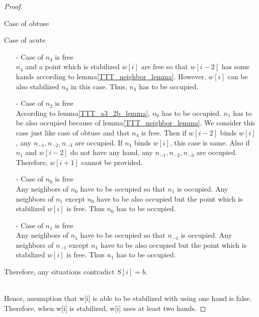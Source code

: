 \documentclass[runningheads]{llncs}
\begin{document}
\begin{proof}
\begin{paragraph}{Case of obtuse}
\end{paragraph}



\begin{paragraph}{Case of acute}
\begin{itemize}
\item[-] Case of $n_4$ is free\\
$n_4$ and a point which is stabilized $w[i]$ are free so that  $w[i-2]$ has some hands according to lemma\ref{TTT_neighbor_lemma}.
However, $w[i]$ can be also stabilized $n_4$ in this case. Thus, $n_4$ has to be occupied.
\item[-] Case of $n_2$ is free\\
According to lemma\ref{TTT_a3_2b_lemma}, $n_0$ has to be occupied. $n_1$ has to be also occupied because of lemma\ref{TTT_neighbor_lemma}.
We consider this case just like case of obtuse and that $n_4$ is free. Then if $w[i-2]$ binds $w[i]$, any $n_{-1}, n_{-2}, n_{-3}$ are occupied. If $n_1$ binds $w[i]$, this case is same. Also if $n_1$ and $w[i-2]$ do not have any hand, any $n_{-1}, n_{-2}, n_{-3}$ are occupied. Therefore, $w[i+1]$ cannot be provided.
\item[-] Case of $n_0$ is free\\
Any neighbors of $n_0$ have to be occupied so that $n_{1}$ is occupied. Any neighbors of $n_{1}$ except $n_0$ have to be also occupied but the point which is stabilized $w[i]$ is free. Thus $n_0$ has to be occupied. 
\item[-] Case of $n_1$ is free\\
Any neighbors of $n_1$ have to be occupied so that $n_{-1}$ is occupied. Any neighbors of $n_{-1}$ except $n_1$ have to be also occupied but the point which is stabilized $w[i]$ is free. Thus $n_1$ has to be occupied. 
\end{itemize}

Therefore, any situations contradict $S[i] = b$.
\end{paragraph}\\


Hence, assumption that w[i] is able to be stabilized with using one hand is false.
Therefore, when w[i] is stabilized, w[i] uses at least two hands.
\end{proof}
\end{document}
